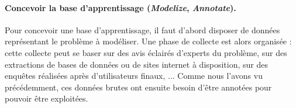 		
		\paragraph{Concevoir la base d'apprentissage (\textit{\textbf{M}odelize}, \textit{\textbf{A}nnotate}).}
		
			Pour concevoir une base d'apprentissage, il faut d'abord disposer de données représentant le problème à modéliser.
			Une phase de collecte est alors organisée : cette collecte peut se baser sur des avis éclairés d'experts du problème, sur des extractions de bases de données ou de sites internet à disposition, sur des enquêtes réalisées après d'utilisateurs finaux, ...
			Comme nous l'avons vu précédemment, ces données brutes ont ensuite besoin d'être annotées pour pouvoir être exploitées.
			
			
			
			
